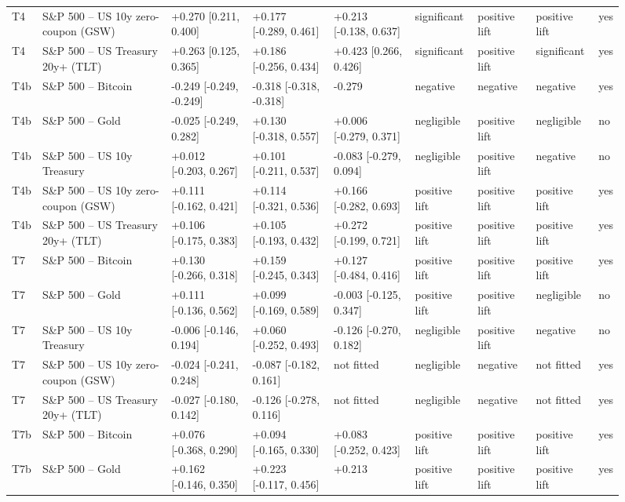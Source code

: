 \begin{figure}[t]
{\begin{tabular}{lllllllll}
T4 & S\&P 500 -- US 10y zero-coupon (GSW) & +0.270 [0.211, 0.400] & +0.177 [-0.289, 0.461] & +0.213 [-0.138, 0.637] & significant & positive lift & positive lift & yes \\
T4 & S\&P 500 -- US Treasury 20y+ (TLT) & +0.263 [0.125, 0.365] & +0.186 [-0.256, 0.434] & +0.423 [0.266, 0.426] & significant & positive lift & significant & yes \\
T4b & S\&P 500 -- Bitcoin & -0.249 [-0.249, -0.249] & -0.318 [-0.318, -0.318] & -0.279 & negative & negative & negative & yes \\
T4b & S\&P 500 -- Gold & -0.025 [-0.249, 0.282] & +0.130 [-0.318, 0.557] & +0.006 [-0.279, 0.371] & negligible & positive lift & negligible & no \\
T4b & S\&P 500 -- US 10y Treasury & +0.012 [-0.203, 0.267] & +0.101 [-0.211, 0.537] & -0.083 [-0.279, 0.094] & negligible & positive lift & negative & no \\
T4b & S\&P 500 -- US 10y zero-coupon (GSW) & +0.111 [-0.162, 0.421] & +0.114 [-0.321, 0.536] & +0.166 [-0.282, 0.693] & positive lift & positive lift & positive lift & yes \\
T4b & S\&P 500 -- US Treasury 20y+ (TLT) & +0.106 [-0.175, 0.383] & +0.105 [-0.193, 0.432] & +0.272 [-0.199, 0.721] & positive lift & positive lift & positive lift & yes \\
T7 & S\&P 500 -- Bitcoin & +0.130 [-0.266, 0.318] & +0.159 [-0.245, 0.343] & +0.127 [-0.484, 0.416] & positive lift & positive lift & positive lift & yes \\
T7 & S\&P 500 -- Gold & +0.111 [-0.136, 0.562] & +0.099 [-0.169, 0.589] & -0.003 [-0.125, 0.347] & positive lift & positive lift & negligible & no \\
T7 & S\&P 500 -- US 10y Treasury & -0.006 [-0.146, 0.194] & +0.060 [-0.252, 0.493] & -0.126 [-0.270, 0.182] & negligible & positive lift & negative & no \\
T7 & S\&P 500 -- US 10y zero-coupon (GSW) & -0.024 [-0.241, 0.248] & -0.087 [-0.182, 0.161] & not fitted & negligible & negative & not fitted & yes \\
T7 & S\&P 500 -- US Treasury 20y+ (TLT) & -0.027 [-0.180, 0.142] & -0.126 [-0.278, 0.116] & not fitted & negligible & negative & not fitted & yes \\
T7b & S\&P 500 -- Bitcoin & +0.076 [-0.368, 0.290] & +0.094 [-0.165, 0.330] & +0.083 [-0.252, 0.423] & positive lift & positive lift & positive lift & yes \\
T7b & S\&P 500 -- Gold & +0.162 [-0.146, 0.350] & +0.223 [-0.117, 0.456] & +0.213 & positive lift & positive lift & positive lift & yes \\

\end{tabular}}
\end{figure}
